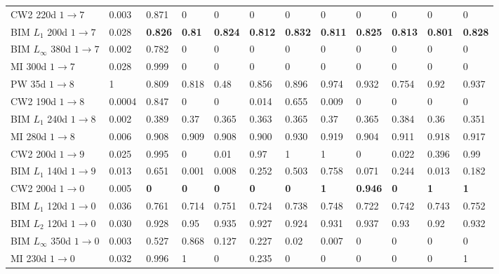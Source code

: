 \documentclass[12pt]{article}
\begin{document}
\begin{table}[t]
\begin{center}
{\begin{tabular}{|l|l|llllllllll|}
CW2 220d $1\to 7$&0.003 & 0.871 & 0 & 0 & 0 & 0 & 0 & 0 & 0 & 0 & 0 \\
BIM $L_1$ 200d $1\to 7$&0.028 & {\bf 0.826} & {\bf 0.81}  &  {\bf
  0.824} & {\bf 0.812} & {\bf 0.832} & {\bf 0.811} & {\bf 0.825} &
{\bf 0.813} & {\bf 0.801} & {\bf 0.828}\\
BIM $L_{\infty}$ 380d $1\to 7$&0.002 & 0.782 & 0 & 0 & 0 & 0 & 0 & 0 & 0 & 0 & 0\\
MI 300d $1\to 7$&0.028 & 0.999 & 0 & 0 & 0 & 0 & 0 & 0 & 0 & 0 & 0\\\hline
PW 35d $1\to 8$&1 &0.809&0.818&0.48&0.856&0.896&0.974&0.932&0.754&0.92&0.937 \\
CW2 190d $1\to 8$&0.0004 & 0.847 & 0 & 0 & 0.014 & 0.655 & 0.009 & 0 & 0 & 0 & 0 \\
BIM $L_1$ 240d $1\to 8$&0.002 & 0.389 & 0.37  & 0.365 & 0.363 & 0.365 & 0.37  & 0.365 & 0.384 & 0.36  & 0.351\\
MI 280d $1\to 8$&0.006 & 0.908 & 0.909 & 0.908 & 0.900 & 0.930 & 0.919 & 0.904 & 0.911 & 0.918 & 0.917\\\hline
CW2 200d $1\to 9$&0.025 & 0.995 & 0 & 0.01 & 0.97 & 1 & 1 & 0 & 0.022 & 0.396 & 0.99\\
BIM $L_1$ 140d $1\to 9$&0.013 & 0.651 & 0.001 & 0.008 & 0.252 & 0.503  & 0.758 & 0.071 & 0.244 & 0.013 & 0.182\\\hline
CW2 200d $1\to 0$ & 0.005& {\bf 0} & {\bf 0} & {\bf 0} & {\bf 0} &
{\bf 0}     & {\bf 1} & {\bf 0.946} & {\bf 0} & {\bf 1} & {\bf 1}\\
BIM $L_1$ 120d $1\to 0$&0.036 & 0.761 & 0.714 & 0.751 & 0.724 & 0.738 & 0.748 & 0.722& 0.742 & 0.743 & 0.752\\
BIM $L_2$ 120d $1\to 0$&0.030 & 0.928 & 0.95  & 0.935 & 0.927 & 0.924 & 0.931 & 0.937 & 0.93  & 0.92  & 0.932\\
BIM $L_{\infty}$ 350d $1\to 0$&0.003 & 0.527 & 0.868 & 0.127 & 0.227 & 0.02 & 0.007 &0 & 0 & 0 & 0 \\
MI 230d $1\to 0$&0.032 & 0.996 & 1 & 0 & 0.235 & 0 & 0 & 0 & 0 & 0 & 1\\
\hline
\end{tabular} }
\end{center}
\end{table}
\end{document}
